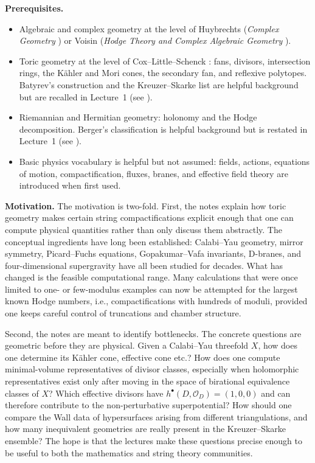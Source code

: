 \medskip
\noindent\textbf{Prerequisites.}
\begin{itemize}[nosep,leftmargin=*]
    \item Algebraic and complex geometry at the level of Huybrechts
    (\emph{Complex Geometry} \cite{Huybrechts:2005complex}) or
    Voisin (\emph{Hodge Theory and Complex Algebraic Geometry}
    \cite{Voisin:2002}).
    \item Toric geometry at the level of Cox--Little--Schenck
    \cite{cox-little-schenck:toric}: fans, divisors, intersection
    rings, the K\"ahler and Mori cones, the secondary fan, and
    reflexive polytopes. Batyrev's construction
    \cite{Batyrev:1993oya} and the Kreuzer--Skarke list
    \cite{Kreuzer:2000xy} are helpful background but are recalled in
    Lecture~1 (see ).
    \item Riemannian and Hermitian geometry: holonomy and the Hodge
    decomposition. Berger's classification is helpful background but
    is restated in Lecture~1 (see ).
    \item Basic physics vocabulary is helpful but not assumed: fields,
    actions, equations of motion, compactification, fluxes, branes,
    and effective field theory are introduced when first used.
\end{itemize}


\medskip
\noindent\textbf{Motivation.}
The motivation is two-fold. First, the notes explain how toric
geometry makes certain string compactifications explicit enough that
one can compute physical quantities rather than only discuss them
abstractly. The conceptual ingredients have long been established:
Calabi--Yau geometry, mirror symmetry, Picard--Fuchs equations,
Gopakumar--Vafa invariants, D-branes, and four-dimensional
supergravity have all been studied for decades. What has changed is
the feasible computational range. Many calculations that were once
limited to one- or few-modulus examples can now be attempted for the largest known Hodge numbers, i.e., compactifications with hundreds of moduli, provided one keeps careful control of
truncations and chamber structure.

Second, the notes are meant to identify bottlenecks. 
The concrete questions are geometric before they are
physical. Given a Calabi--Yau threefold $X$, how does one determine
its K\"ahler cone, effective cone etc.?
How does one compute minimal-volume representatives of divisor
classes, especially when holomorphic representatives exist only after
moving in the space of birational equivalence classes of $X$? Which effective divisors have
$h^\bullet(D,\mathcal{O}_D)=(1,0,0)$ and can therefore contribute to
the non-perturbative superpotential? How should one compare the Wall
data of hypersurfaces arising from different triangulations, and how
many inequivalent geometries are really present in the
Kreuzer--Skarke ensemble? 
The hope is that the lectures make these questions precise enough to
be useful to both the mathematics and string theory communities.

